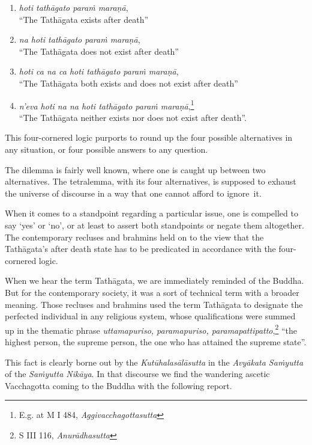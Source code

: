\begin{enumerate}
\def\labelenumi{\arabic{enumi}.}
\tightlist
\item
  \emph{hoti tathāgato paraṁ maraṇā},\\
  ``The Tathāgata exists after death''
\item
  \emph{na hoti tathāgato paraṁ maraṇā},\\
  ``The Tathāgata does not exist after death''
\item
  \emph{hoti ca na ca hoti tathāgato paraṁ maraṇā},\\
  ``The Tathāgata both exists and does not exist after death''
\item
  \emph{n'eva hoti na na hoti tathāgato paraṁ maraṇā},\footnote{E.g. at M I 484, \emph{Aggivacchagottasutta}}\\
  ``The Tathāgata neither exists nor does not exist after death''.
\end{enumerate}

This four-cornered logic purports to round up the four possible alternatives in any situation, or four possible answers to any question.

The dilemma is fairly well known, where one is caught up between two alternatives. The tetralemma, with its four alternatives, is supposed to exhaust the universe of discourse in a way that one cannot afford to ignore~it.

When it comes to a standpoint regarding a particular issue, one is compelled to say `yes' or `no', or at least to assert both standpoints or negate them altogether. The contemporary recluses and brahmins held on to the view that the Tathāgata's after death state has to be predicated in accordance with the four-cornered logic.

When we hear the term Tathāgata, we are immediately reminded of the Buddha. But for the contemporary society, it was a sort of technical term with a broader meaning. Those recluses and brahmins used the term Tathāgata to designate the perfected individual in any religious system, whose qualifications were summed up in the thematic phrase \emph{uttamapuriso, paramapuriso, paramapattipatto},\footnote{S III 116, \emph{Anurādhasutta}} ``the highest person, the supreme person, the one who has attained the supreme state''.

This fact is clearly borne out by the \emph{Kutūhalasālāsutta} in the \emph{Avyākata Saṁyutta} of the \emph{Saṁyutta Nikāya}. In that discourse we find the wandering ascetic Vacchagotta coming to the Buddha with the following report.

